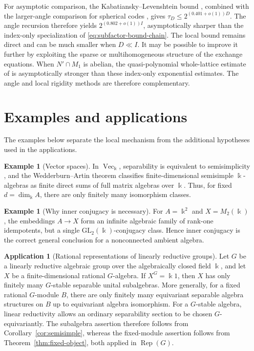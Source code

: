 \documentclass[11pt]{amsart}
\theoremstyle{definition}
\newtheorem{example}[theorem]{Example}
\newtheorem{application}[theorem]{Application}
\theoremstyle{remark}
\newcommand{\kk}{\Bbbk}
\DeclareMathOperator{\Rep}{Rep}
\DeclareMathOperator{\Vect}{Vec}
\begin{document}
For asymptotic comparison, the Kabatiansky--Levenshtein bound
\cite{KabatianskyLevenshtein}, combined with the larger-angle comparison
for spherical codes \cite[\S{}2, (2.5)--(2.6) and footnote~1]{CohnZhao},
gives $\tau_D\leq2^{(0.401+o(1))D}$.  The angle recursion therefore yields
$2^{(0.802+o(1))I}$, asymptotically sharper than the index-only
specialization of \eqref{eq:subfactor-bound-chain}.  The local
bound remains direct and can be much smaller when $D\ll I$.  It may be
possible to improve it further by exploiting the sparse or
multihomogeneous structure of the exchange equations.  When
$N'\cap M_1$ is abelian, the quasi-polynomial whole-lattice estimate of
\cite{BakshiDasLiuRen} is asymptotically stronger than these
index-only exponential estimates.  The angle and local
rigidity methods are therefore complementary.
\section{Examples and applications}\label{sec:examples}

The examples below separate the local mechanism from the additional
hypotheses used in the applications.

\begin{example}[Vector spaces]
In $\Vect_{\kk}$, separability is equivalent to semisimplicity
\cite[Chapter~II, \S1]{DeMeyerIngraham}, and the Wedderburn--Artin theorem
\cite[Chapter~1, \S\S2--3]{Lam} classifies finite-dimensional semisimple
$\kk$-algebras as finite direct sums of full matrix algebras over $\kk$.  Thus,
for fixed $d=\dim_{\kk}A$, there are only finitely many isomorphism classes.
\end{example}

\begin{example}[Why inner conjugacy is necessary]
For $A=\kk^2$ and $X=M_2(\kk)$, the embeddings $A\to X$ form an
infinite algebraic family of rank-one idempotents, but a single
$\mathrm{GL}_2(\kk)$-conjugacy class.  Hence inner conjugacy is the correct
general conclusion for a nonconnected ambient algebra.
\end{example}

\begin{application}[Rational representations of linearly reductive groups]
Let $G$ be a linearly reductive algebraic group over the algebraically closed
field $\kk$, and let $X$ be a finite-dimensional rational $G$-algebra.  If
$X^G=\kk 1$, then $X$ has only
finitely many $G$-stable separable unital subalgebras.  More generally, for a
fixed rational $G$-module $B$, there are only finitely many equivariant
separable algebra structures on $B$ up to equivariant algebra isomorphism.
For a $G$-stable algebra, linear reductivity allows an ordinary
separability section to be chosen $G$-equivariantly.  The subalgebra
assertion therefore follows from Corollary~\ref{cor:semisimple}, whereas
the fixed-module assertion follows from Theorem~\ref{thm:fixed-object},
both applied in $\Rep(G)$.
\end{application}
\end{document}

